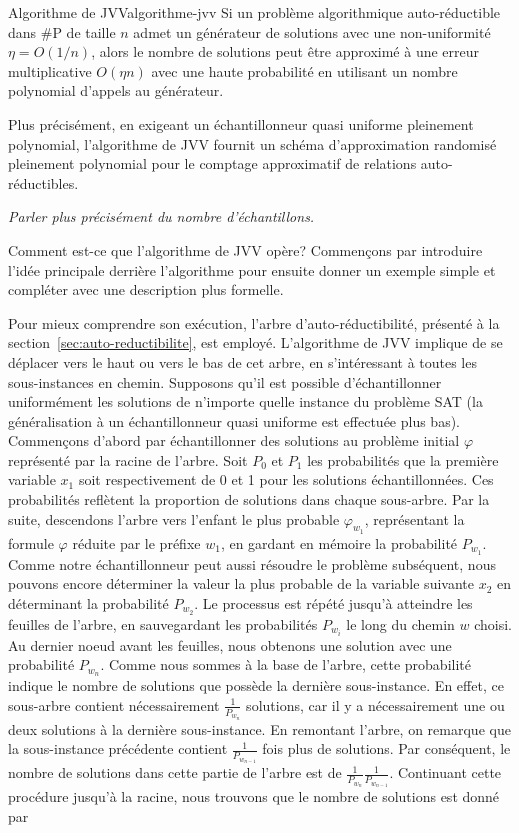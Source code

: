 \begin{maintheorem}{Algorithme de JVV}{algorithme-jvv}
    Si un problème algorithmique auto-réductible dans \textsf{\#P} de taille $n$ admet un générateur de solutions avec une non-uniformité $\eta = O(1 / n)$, alors le nombre de solutions peut être approximé à une erreur multiplicative $O(\eta n)$ avec une haute probabilité en utilisant un nombre polynomial d'appels au générateur.
\end{maintheorem}

Plus précisément, en exigeant un échantillonneur quasi uniforme pleinement polynomial, l'algorithme de JVV fournit un schéma d'approximation randomisé pleinement polynomial pour le comptage approximatif de relations auto-réductibles.

\textcolor{mydarkred}{\textit{Parler plus précisément du nombre d'échantillons.}}

Comment est-ce que l'algorithme de JVV opère? Commençons par introduire l'idée principale derrière l'algorithme pour ensuite donner un exemple simple et compléter avec une description plus formelle. 

Pour mieux comprendre son exécution, l'arbre d'auto-réductibilité, présenté à la section~\ref{sec:auto-reductibilite}, est employé. L'algorithme de JVV implique de se déplacer vers le haut ou vers le bas de cet arbre, en s'intéressant à toutes les sous-instances en chemin. Supposons qu'il est possible d'échantillonner uniformément les solutions de n'importe quelle instance du problème SAT (la généralisation à un échantillonneur quasi uniforme est effectuée plus bas). Commençons d'abord par échantillonner des solutions au problème initial $\varphi$ représenté par la racine de l'arbre. Soit $P_{0}$ et $P_{1}$ les probabilités que la première variable $x_{1}$ soit respectivement de 0 et 1 pour les solutions échantillonnées. Ces probabilités reflètent la proportion de solutions dans chaque sous-arbre. Par la suite, descendons l'arbre vers l'enfant le plus probable $\varphi_{w_{1}}$, représentant la formule $\varphi$ réduite par le préfixe $w_{1}$, en gardant en mémoire la probabilité $P_{w_{1}}$. Comme notre échantillonneur peut aussi résoudre le problème subséquent, nous pouvons encore déterminer la valeur la plus probable de la variable suivante $x_{2}$ en déterminant la probabilité $P_{w_{2}}$. Le processus est répété jusqu'à atteindre les feuilles de l'arbre, en sauvegardant les probabilités $P_{w_{i}}$ le long du chemin $w$ choisi. Au dernier noeud avant les feuilles, nous obtenons une solution avec une probabilité $P_{w_{n}}$. Comme nous sommes à la base de l'arbre, cette probabilité indique le nombre de solutions que possède la dernière sous-instance. En effet, ce sous-arbre contient nécessairement $\frac{1}{P_{w_{n}}}$ solutions, car il y a nécessairement une ou deux solutions à la dernière sous-instance. En remontant l'arbre, on remarque que la sous-instance précédente contient $\frac{1}{P_{w_{n-1}}}$ fois plus de solutions. Par conséquent, le nombre de solutions dans cette partie de l'arbre est de $\frac{1}{P_{w_{n}}} \frac{1}{P_{w_{n-1}}}$. Continuant cette procédure jusqu'à la racine, nous trouvons que le nombre de solutions est donné par 

